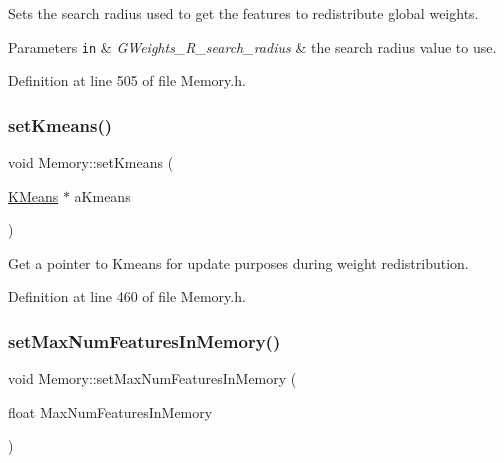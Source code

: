 Sets the search radius used to get the features to redistribute global weights.


\begin{DoxyParams}[1]{Parameters}
\mbox{\tt in}  & {\em G\+Weights\+\_\+\+R\+\_\+search\+\_\+radius} & the search radius value to use. \\
\hline
\end{DoxyParams}


Definition at line 505 of file Memory.\+h.

\mbox{\label{class_memory_a84fcb51d7b244744161b27fe731eb1dc}} 
\subsubsection{\texorpdfstring{set\+Kmeans()}{setKmeans()}}
{\footnotesize\ttfamily void Memory\+::set\+Kmeans (\begin{DoxyParamCaption}\item[{\hyperlink{class_k_means}{K\+Means} $\ast$}]{a\+Kmeans }\end{DoxyParamCaption})\hspace{0.3cm}{\ttfamily [inline]}}

Get a pointer to Kmeans for update purposes during weight redistribution. 

Definition at line 460 of file Memory.\+h.

\mbox{\label{class_memory_a87e6f6575dde85b6e823370fe8b94d16}} 
\subsubsection{\texorpdfstring{set\+Max\+Num\+Features\+In\+Memory()}{setMaxNumFeaturesInMemory()}}
{\footnotesize\ttfamily void Memory\+::set\+Max\+Num\+Features\+In\+Memory (\begin{DoxyParamCaption}\item[{float}]{Max\+Num\+Features\+In\+Memory }\end{DoxyParamCaption})\hspace{0.3cm}{\ttfamily [inline]}}



